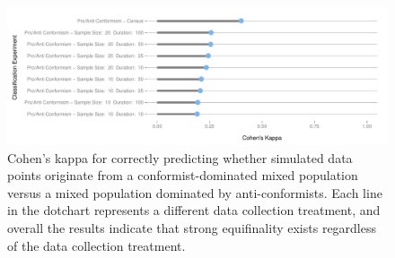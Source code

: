 \documentclass[10pt,letterpaper]{article}
\begin{document}
\begin{figure}[ht]
\centering
\includegraphics[scale=0.5]{figure/proanticomparison-kappa-dotchart.pdf}
\caption{Cohen's kappa for correctly predicting whether simulated data points originate from a conformist-dominated mixed population versus a mixed population dominated by anti-conformists.  Each line in the dotchart represents a different data collection treatment, and overall the results indicate that strong equifinality exists regardless of the data collection treatment.}
\label{img:proanti-kappa}
\end{figure}
\end{document}
